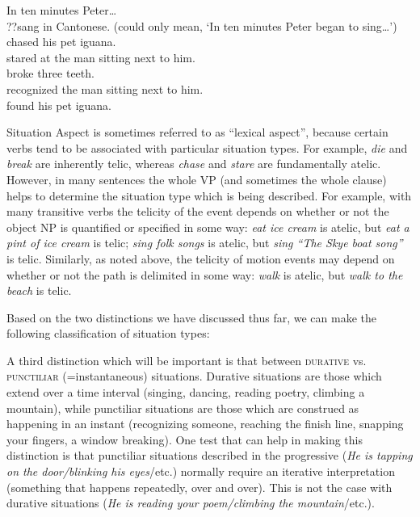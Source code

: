 \ea \label{ex:20.7}
In ten minutes Peter…\\
\ea  ??sang in Cantonese.  (could only mean, ‘In ten minutes Peter began to sing…’)\\
\ex *chased his pet iguana.\\
\ex *stared at the man sitting next to him.\\
\ex broke three teeth.\\
\ex recognized the man sitting next to him.\\
\ex found his pet iguana.
                       \z
\z


Situation Aspect is sometimes referred to as “lexical aspect”, because certain verbs tend to be associated with particular situation types. For example, \textit{die} and \textit{break} are inherently telic, whereas \textit{chase} and \textit{stare} are fundamentally atelic. However, in many sentences the whole VP (and sometimes the whole clause) helps to determine the situation type which is being described. For example, with many transitive verbs the telicity of the event depends on whether or not the object NP is quantified or specified in some way: \textit{eat ice cream} is atelic, but \textit{eat a pint of ice cream} is telic; \textit{sing folk songs} is atelic, but \textit{sing “The Skye boat song”} is telic. Similarly, as noted above, the telicity of motion events may depend on whether or not the path is delimited in some way: \textit{walk} is atelic, but \textit{walk to the beach} is telic.



Based on the two distinctions we have discussed thus far, we can make the following classification of situation types:




A third distinction which will be important is that between \textsc{durative} vs. \textsc{punctiliar} (=instantaneous) situations. Durative situations are those which extend over a time interval (singing, dancing, reading poetry, climbing a mountain), while punctiliar situations are those which are construed as happening in an instant (recognizing someone, reaching the finish line, snapping your fingers, a window breaking). One test that can help in making this distinction is that punctiliar situations described in the progressive (\textit{He is tapping on the door/blinking his eyes}/etc.) normally require an iterative interpretation (something that happens repeatedly, over and over). This is not the case with durative situations (\textit{He is reading your poem/climbing the mountain}/etc.).




